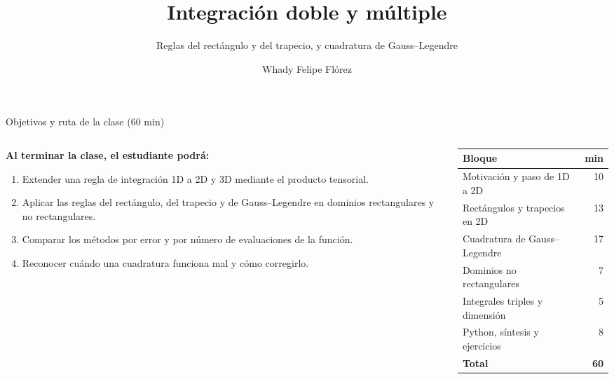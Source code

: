\documentclass[aspectratio=169,10pt]{beamer}
\title{Integraci\'on doble y m\'ultiple}
\subtitle{Reglas del rect\'angulo y del trapecio, y cuadratura de Gauss--Legendre}
\author{Whady Felipe Fl\'orez}
\institute{M\'etodos Num\'ericos -- Pregrado}
\date{}
\begin{document}
\maketitle

\begin{frame}{Objetivos y ruta de la clase (60 min)}
\begin{columns}[T]
\begin{column}{0.52\textwidth}
\textbf{Al terminar la clase, el estudiante podr\'a:}
\begin{enumerate}
\item Extender una regla de integraci\'on 1D a 2D y 3D mediante el \alert{producto tensorial}.
\item Aplicar las reglas del rect\'angulo, del trapecio y de Gauss--Legendre en dominios rectangulares y no rectangulares.
\item Comparar los m\'etodos por \alert{error} y por \alert{n\'umero de evaluaciones} de la funci\'on.
\item Reconocer cu\'ando una cuadratura funciona mal y c\'omo corregirlo.
\end{enumerate}
\end{column}
\begin{column}{0.44\textwidth}
\small
\begin{tabular}{@{}lr@{}}
\toprule
Bloque & min\\
\midrule
Motivaci\'on y paso de 1D a 2D & 10\\
Rect\'angulos y trapecios en 2D & 13\\
Cuadratura de Gauss--Legendre & 17\\
Dominios no rectangulares & 7\\
Integrales triples y dimensi\'on & 5\\
Python, s\'intesis y ejercicios & 8\\
\midrule
\textbf{Total} & \textbf{60}\\
\bottomrule
\end{tabular}
\end{column}
\end{columns}
\end{frame}
\end{document}
